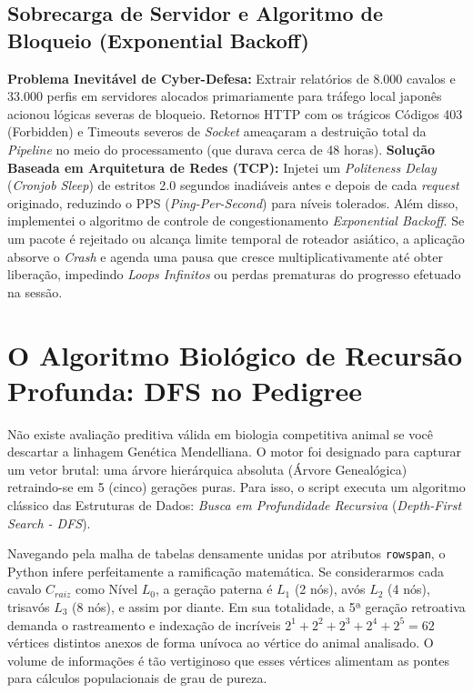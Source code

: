 \documentclass[12pt,a4paper]{article}
\begin{document}
\subsection{Sobrecarga de Servidor e Algoritmo de Bloqueio (Exponential Backoff)}
\textbf{Problema Inevitável de Cyber-Defesa:} Extrair relatórios de 8.000 cavalos e 33.000 perfis em servidores alocados primariamente para tráfego local japonês acionou lógicas severas de bloqueio. Retornos HTTP com os trágicos Códigos 403 (Forbidden) e Timeouts severos de \textit{Socket} ameaçaram a destruição total da \textit{Pipeline} no meio do processamento (que durava cerca de 48 horas).
\textbf{Solução Baseada em Arquitetura de Redes (TCP):} Injetei um \textit{Politeness Delay} (\textit{Cronjob Sleep}) de estritos 2.0 segundos inadiáveis antes e depois de cada \textit{request} originado, reduzindo o PPS (\textit{Ping-Per-Second}) para níveis tolerados. Além disso, implementei o algoritmo de controle de congestionamento \textit{Exponential Backoff}. Se um pacote é rejeitado ou alcança limite temporal de roteador asiático, a aplicação absorve o \textit{Crash} e agenda uma pausa que cresce multiplicativamente até obter liberação, impedindo \textit{Loops Infinitos} ou perdas prematuras do progresso efetuado na sessão.

\section{O Algoritmo Biológico de Recursão Profunda: DFS no Pedigree}
Não existe avaliação preditiva válida em biologia competitiva animal se você descartar a linhagem Genética Mendelliana.
O motor foi designado para capturar um vetor brutal: uma árvore hierárquica absoluta (Árvore Genealógica) retraindo-se em 5 (cinco) gerações puras. Para isso, o script executa um algoritmo clássico das Estruturas de Dados: \textit{Busca em Profundidade Recursiva} (\textit{Depth-First Search - DFS}).

Navegando pela malha de tabelas densamente unidas por atributos \texttt{rowspan}, o Python infere perfeitamente a ramificação matemática. Se considerarmos cada cavalo $C_{raiz}$ como Nível $L_0$, a geração paterna é $L_1$ (2 nós), avós $L_2$ (4 nós), trisavós $L_3$ (8 nós), e assim por diante. Em sua totalidade, a 5ª geração retroativa demanda o rastreamento e indexação de incríveis $2^1 + 2^2 + 2^3 + 2^4 + 2^5 = 62$ vértices distintos anexos de forma unívoca ao vértice do animal analisado. O volume de informações é tão vertiginoso que esses vértices alimentam as pontes para cálculos populacionais de grau de pureza.
\end{document}
